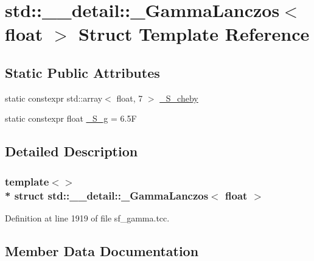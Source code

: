 \hypertarget{structstd_1_1____detail_1_1__GammaLanczos_3_01float_01_4}{}\section{std\+:\+:\+\_\+\+\_\+detail\+:\+:\+\_\+\+Gamma\+Lanczos$<$ float $>$ Struct Template Reference}
\label{structstd_1_1____detail_1_1__GammaLanczos_3_01float_01_4}
\subsection*{Static Public Attributes}
\begin{DoxyCompactItemize}
\item 
static constexpr std\+::array$<$ float, 7 $>$ \hyperlink{structstd_1_1____detail_1_1__GammaLanczos_3_01float_01_4_aef3020e056eda28af9d59f9f7f15bb96}{\+\_\+\+S\+\_\+cheby}
\item 
static constexpr float \hyperlink{structstd_1_1____detail_1_1__GammaLanczos_3_01float_01_4_a76b72c5d8c5385cf17a304b136ff2600}{\+\_\+\+S\+\_\+g} = 6.\+5F
\end{DoxyCompactItemize}


\subsection{Detailed Description}
\subsubsection*{template$<$$>$\\*
struct std\+::\+\_\+\+\_\+detail\+::\+\_\+\+Gamma\+Lanczos$<$ float $>$}



Definition at line 1919 of file sf\+\_\+gamma.\+tcc.



\subsection{Member Data Documentation}

